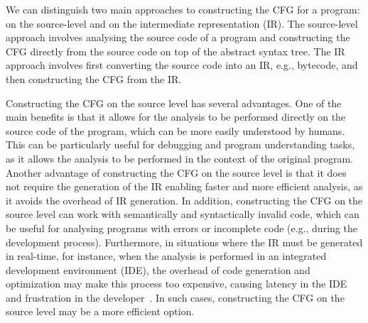 We can distinguish two main approaches to constructing the CFG for a program:
on the source-level and on the intermediate representation (IR). The source-level approach
involves analysing the source code of a program and constructing the CFG
directly from the source code on top of the abstract syntax tree. The IR approach involves
first converting the source code into an IR, e.g., bytecode,
and then constructing the CFG from the IR.

Constructing the CFG on the source level has several advantages.
One of the main benefits is that it allows for the analysis to be performed directly
on the source code of the program, which can be more easily understood by humans.
This can be particularly useful for debugging and program understanding tasks,
as it allows the analysis to be performed in the context of the original program.
Another advantage of constructing the CFG on the source level is that it does not
require the generation of the IR enabling faster and more efficient analysis,
as it avoids the overhead of IR generation.
In addition, constructing the CFG on the source level can work with semantically
and syntactically invalid code, which can be useful for analysing programs with
errors or incomplete code (e.g., during the development process).
Furthermore, in situations where the IR must be generated in real-time,
for instance, when the analysis is performed in an integrated development environment (IDE),
the overhead of code generation and optimization may make this process too expensive,
causing latency in the IDE and frustration in the developer~\cite{piskachev2022far}.
In such cases, constructing the CFG on the source level
may be a more efficient option.

